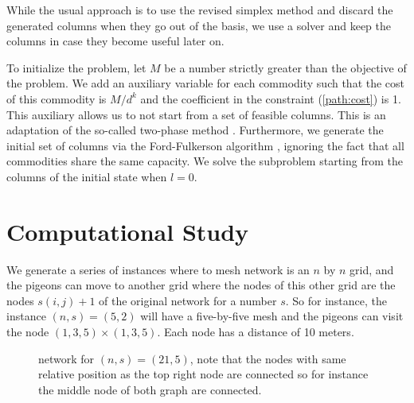 \documentclass{article}
\begin{document}
    While the usual approach is to use the revised simplex method and discard the generated columns when they go out of the basis, we use a solver and keep the columns in case they become useful later on.

    To initialize the problem, let $M$ be a number strictly greater than the objective of the problem. We add an auxiliary variable for each commodity such that the cost of this commodity is $M/d^k$ and the coefficient in the constraint (\ref{path:cost}) is 1. This auxiliary allows us to not start from a set of feasible columns. This is an adaptation of the so-called two-phase method \parencite{wagnerTwoPhaseMethodSimplex1956}. Furthermore, we generate the initial set of columns via the Ford-Fulkerson algorithm \parencite{fordMaximalFlowNetwork1956}, ignoring the fact that all commodities share the same capacity. We solve the subproblem starting from the columns of the initial state when $l=0$.

    \section{Computational Study}

    We generate a series of instances where to mesh network is an $n$ by $n$ grid, and the pigeons can move to another grid where the nodes of this other grid are the nodes $s(i, j) + 1$ of the original network for a number $s$. So for instance, the instance $(n, s)=(5, 2)$ will have a five-by-five mesh and the pigeons can visit the node $(1, 3, 5) \times (1, 3, 5)$. Each node has a distance of 10 meters.

    \begin{figure}[h]
        \centering
        \qquad
        \caption{network for $(n, s) = (21, 5)$, note that the nodes with same relative position as the top right node are connected so for instance the middle node of both graph are connected.}
    \end{figure}
\end{document}
